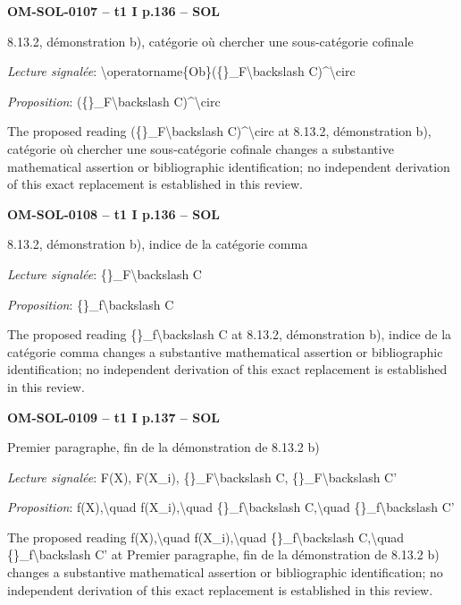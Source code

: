\par\noindent\textbf{OM-SOL-0107 -- t1 I p.136 -- SOL}\par
8.13.2, démonstration b), catégorie où chercher une sous-catégorie cofinale\par
\emph{Lecture signalée}: \textbackslash{}operatorname\{Ob\}(\{\}\_F\textbackslash{}backslash C)\textasciicircum{}\textbackslash{}circ\par
\emph{Proposition}: (\{\}\_F\textbackslash{}backslash C)\textasciicircum{}\textbackslash{}circ\par
The proposed reading (\{\}\_F\textbackslash{}backslash C)\textasciicircum{}\textbackslash{}circ at 8.13.2, démonstration b), catégorie où chercher une sous-catégorie cofinale changes a substantive mathematical assertion or bibliographic identification; no independent derivation of this exact replacement is established in this review.\par
\par\noindent\textbf{OM-SOL-0108 -- t1 I p.136 -- SOL}\par
8.13.2, démonstration b), indice de la catégorie comma\par
\emph{Lecture signalée}: \{\}\_F\textbackslash{}backslash C\par
\emph{Proposition}: \{\}\_f\textbackslash{}backslash C\par
The proposed reading \{\}\_f\textbackslash{}backslash C at 8.13.2, démonstration b), indice de la catégorie comma changes a substantive mathematical assertion or bibliographic identification; no independent derivation of this exact replacement is established in this review.\par
\par\noindent\textbf{OM-SOL-0109 -- t1 I p.137 -- SOL}\par
Premier paragraphe, fin de la démonstration de 8.13.2 b)\par
\emph{Lecture signalée}: F(X), F(X\_i), \{\}\_F\textbackslash{}backslash C, \{\}\_F\textbackslash{}backslash C'\par
\emph{Proposition}: f(X),\textbackslash{}quad f(X\_i),\textbackslash{}quad \{\}\_f\textbackslash{}backslash C,\textbackslash{}quad \{\}\_f\textbackslash{}backslash C'\par
The proposed reading f(X),\textbackslash{}quad f(X\_i),\textbackslash{}quad \{\}\_f\textbackslash{}backslash C,\textbackslash{}quad \{\}\_f\textbackslash{}backslash C' at Premier paragraphe, fin de la démonstration de 8.13.2 b) changes a substantive mathematical assertion or bibliographic identification; no independent derivation of this exact replacement is established in this review.\par
